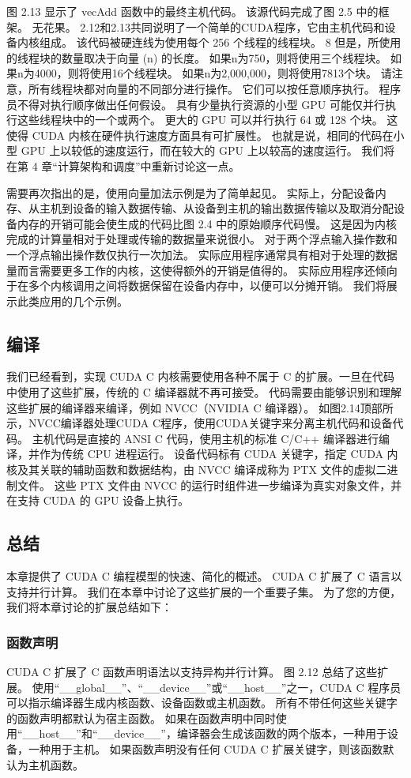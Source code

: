 图 2.13 显示了 vecAdd 函数中的最终主机代码。 该源代码完成了图 2.5 中的框架。 无花果。 2.12和2.13共同说明了一个简单的CUDA程序，它由主机代码和设备内核组成。 该代码被硬连线为使用每个 256 个线程的线程块。 8 但是，所使用的线程块的数量取决于向量 (n) 的长度。 如果n为750，则将使用三个线程块。 如果n为4000，则将使用16个线程块。 如果n为2,000,000，则将使用7813个块。 请注意，所有线程块都对向量的不同部分进行操作。 它们可以按任意顺序执行。 程序员不得对执行顺序做出任何假设。 具有少量执行资源的小型 GPU 可能仅并行执行这些线程块中的一个或两个。 更大的 GPU 可以并行执行 64 或 128 个块。 这使得 CUDA 内核在硬件执行速度方面具有可扩展性。 也就是说，相同的代码在小型 GPU 上以较低的速度运行，而在较大的 GPU 上以较高的速度运行。 我们将在第 4 章“计算架构和调度”中重新讨论这一点。

需要再次指出的是，使用向量加法示例是为了简单起见。 实际上，分配设备内存、从主机到设备的输入数据传输、从设备到主机的输出数据传输以及取消分配设备内存的开销可能会使生成的代码比图 2.4 中的原始顺序代码慢。 这是因为内核完成的计算量相对于处理或传输的数据量来说很小。 对于两个浮点输入操作数和一个浮点输出操作数仅执行一次加法。 实际应用程序通常具有相对于处理的数据量而言需要更多工作的内核，这使得额外的开销是值得的。 实际应用程序还倾向于在多个内核调用之间将数据保留在设备内存中，以便可以分摊开销。 我们将展示此类应用的几个示例。

\subsection{编译}
我们已经看到，实现 CUDA C 内核需要使用各种不属于 C 的扩展。一旦在代码中使用了这些扩展，传统的 C 编译器就不再可接受。 代码需要由能够识别和理解这些扩展的编译器来编译，例如 NVCC（NVIDIA C 编译器）。 如图2.14顶部所示，NVCC编译器处理CUDA C程序，使用CUDA关键字来分离主机代码和设备代码。 主机代码是直接的 ANSI C 代码，使用主机的标准 C/C++ 编译器进行编译，并作为传统 CPU 进程运行。 设备代码标有 CUDA 关键字，指定 CUDA 内核及其关联的辅助函数和数据结构，由 NVCC 编译成称为 PTX 文件的虚拟二进制文件。 这些 PTX 文件由 NVCC 的运行时组件进一步编译为真实对象文件，并在支持 CUDA 的 GPU 设备上执行。

\subsection{总结}
本章提供了 CUDA C 编程模型的快速、简化的概述。 CUDA C 扩展了 C 语言以支持并行计算。 我们在本章中讨论了这些扩展的一个重要子集。 为了您的方便，我们将本章讨论的扩展总结如下：

\subsubsection{函数声明}
CUDA C 扩展了 C 函数声明语法以支持异构并行计算。 图 2.12 总结了这些扩展。 使用“\_\_global\_\_”、“\_\_device\_\_”或“\_\_host\_\_”之一，CUDA C 程序员可以指示编译器生成内核函数、设备函数或主机函数。 所有不带任何这些关键字的函数声明都默认为宿主函数。 如果在函数声明中同时使用“\_\_host\_\_”和“\_\_device\_\_”，编译器会生成该函数的两个版本，一种用于设备，一种用于主机。 如果函数声明没有任何 CUDA C 扩展关键字，则该函数默认为主机函数。

